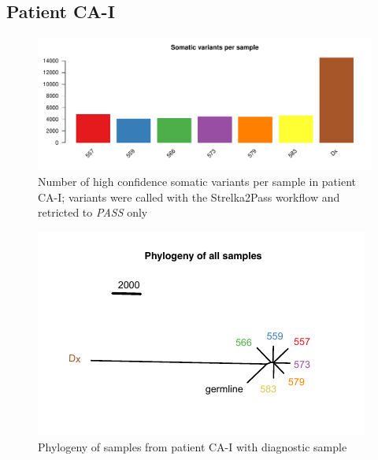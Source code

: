 \subsection{Patient CA-I}

\begin{figure}[ht]
\centering
\includegraphics[width=.99\linewidth]{Figures/CASCADE/CA51/CA51numVars.pdf}
\caption[Number of somatic variants per sample in patient CA-I]{Number of high confidence somatic variants per sample in patient CA-I; variants were called with the Strelka2Pass workflow and retricted to \emph{PASS} only} \label{fig:ca51numVars}
\end{figure}

\begin{figure}[ht]
\centering
\includegraphics[width=.99\linewidth]{Figures/CASCADE/CA51/CA51phyloWithDx.pdf}
\caption[Phylogeny of samples from patient CA-I with diagnostic sample]{Phylogeny of samples from patient CA-I with diagnostic sample} \label{fig:ca51phyloWithDx}
\end{figure}




